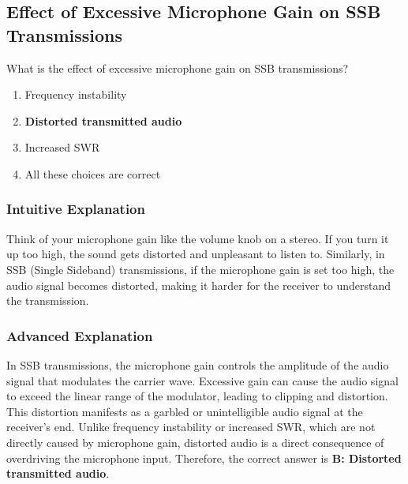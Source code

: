 \subsection{Effect of Excessive Microphone Gain on SSB Transmissions}
\label{T4B01}

\begin{tcolorbox}[colback=gray!10!white,colframe=black!75!black,title=T4B01]
What is the effect of excessive microphone gain on SSB transmissions?
\begin{enumerate}[noitemsep]
    \item Frequency instability
    \item \textbf{Distorted transmitted audio}
    \item Increased SWR
    \item All these choices are correct
\end{enumerate}
\end{tcolorbox}

\subsubsection*{Intuitive Explanation}
Think of your microphone gain like the volume knob on a stereo. If you turn it up too high, the sound gets distorted and unpleasant to listen to. Similarly, in SSB (Single Sideband) transmissions, if the microphone gain is set too high, the audio signal becomes distorted, making it harder for the receiver to understand the transmission.

\subsubsection*{Advanced Explanation}
In SSB transmissions, the microphone gain controls the amplitude of the audio signal that modulates the carrier wave. Excessive gain can cause the audio signal to exceed the linear range of the modulator, leading to clipping and distortion. This distortion manifests as a garbled or unintelligible audio signal at the receiver's end. Unlike frequency instability or increased SWR, which are not directly caused by microphone gain, distorted audio is a direct consequence of overdriving the microphone input. Therefore, the correct answer is \textbf{B: Distorted transmitted audio}.